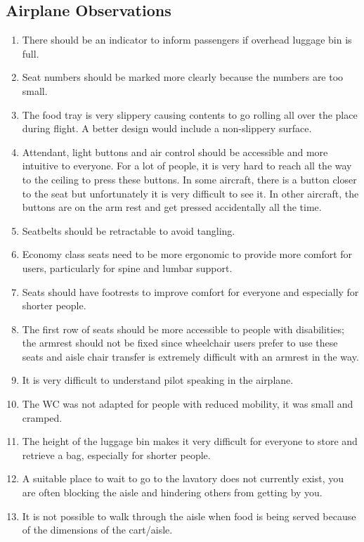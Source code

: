 \subsection{Airplane Observations}
\begin{enumerate}
  \item There should be an indicator to inform passengers if overhead luggage bin is full.
  \item Seat numbers should be marked more clearly because the numbers are too small.
  \item The food tray is very slippery causing contents to go rolling all over the place during flight. A better design would include a non-slippery surface.
  \item Attendant, light buttons and air control should be accessible and more intuitive to everyone. For a lot of people, it is very hard to reach all the way to the ceiling to press these buttons. In some aircraft, there is a button closer to the seat but unfortunately it is very difficult to see it. In other aircraft, the buttons are on the arm rest and get pressed accidentally all the time. 
  \item Seatbelts should be retractable to avoid tangling.
  \item Economy class seats need to be more ergonomic to provide more comfort for users, particularly for spine and lumbar support.
  \item Seats should have footrests to improve comfort for everyone and especially for shorter people. 
  \item The first row of seats should be more accessible to people with disabilities; the armrest should not be fixed since wheelchair users prefer to use these seats and aisle chair transfer is extremely difficult with an armrest in the way. 
  \item It is very difficult to understand pilot speaking in the airplane.
  \item The WC was not adapted for people with reduced mobility, it was small and cramped. 
  \item The height of the luggage bin makes it very difficult for everyone to store and retrieve a bag, especially for shorter people.
  \item  A suitable place to wait to go to the lavatory does not currently exist,  you are often blocking the aisle and hindering others from getting by you. 
  \item It is not possible to walk through the aisle when food is being served because of the dimensions of the cart/aisle.

\end{enumerate}
